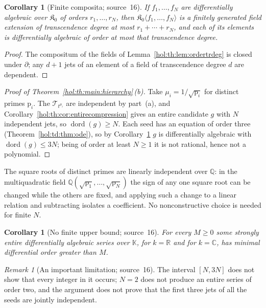 \documentclass[11pt]{article}
\numberwithin{equation}{section}
\newtheorem{corollary}[theorem]{Corollary}
\theoremstyle{definition}
\theoremstyle{remark}
\newtheorem{remark}[theorem]{Remark}
\newcommand{\C}{\mathbb C}
\newcommand{\R}{\mathbb R}
\newcommand{\Q}{\mathbb Q}
\newcommand{\KK}{\mathbb K}
\begin{document}
\begin{corollary}[Finite composita; source~16]\label{hol:th:cor:composita}
If $f_1,\ldots,f_N$ are differentially algebraic over $\mathfrak K_0$ of orders
$r_1,\ldots,r_N$, then $\mathfrak K_0\langle f_1,\ldots,f_N\rangle$ is a finitely
generated field extension of transcendence degree at most $r_1+\cdots+r_N$,
and each of its elements is differentially algebraic of order at most that
transcendence degree.
\end{corollary}

\begin{proof}
The compositum of the fields of Lemma~\ref{hol:th:lem:ordertrdeg} is closed
under $\partial$; any $d+1$ jets of an element of a field of transcendence
degree $d$ are dependent.
\end{proof}

\begin{proof}[Proof of Theorem~\ref{hol:th:main:hierarchy}\,\textup{(b)}]
Take $\mu_i=1/\sqrt{\mathrm p_i}$ for distinct primes $\mathrm p_i$. The
$\mathcal T_{t^{\mu_i}}$ are independent by part~(a), and
Corollary~\ref{hol:th:cor:entirecompression} gives an entire candidate $g$
with $N$ independent jets, so $\operatorname{dord}(g)\ge N$. Each seed has an
equation of order three (Theorem~\ref{hol:td:thm:ode}), so by
Corollary~\ref{hol:th:cor:composita} $g$ is differentially algebraic with
$\operatorname{dord}(g)\le3N$; being of order at least $N\ge1$ it is not
rational, hence not a polynomial.
\end{proof}

The square roots of distinct primes are linearly independent over $\Q$: in
the multiquadratic field $\Q(\sqrt{\mathrm p_1},\ldots,\sqrt{\mathrm p_N})$ the
sign of any one square root can be changed while the others are fixed, and
applying such a change to a linear relation and subtracting isolates a
coefficient. No nonconstructive choice is needed for finite $N$.

\begin{corollary}[No finite upper bound; source~16]\label{hol:th:cor:nobound}
For every $M\ge0$ some strongly entire differentially algebraic series over
$\KK$, for $k=\R$ and for $k=\C$, has minimal differential order greater than
$M$.
\end{corollary}

\begin{remark}[An important limitation; source~16]\label{hol:th:rem:limitation}
The interval $[N,3N]$ does not show that every integer in it occurs; $N=2$
does not produce an entire series of order two, and the argument does not
prove that the first three jets of all the seeds are jointly independent.
\end{remark}
\end{document}
